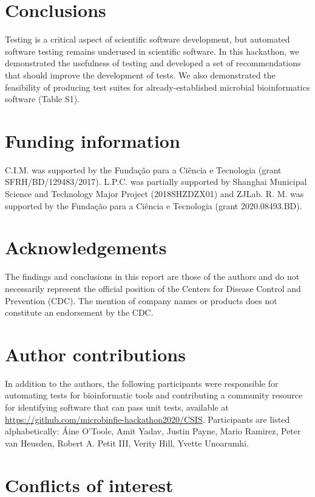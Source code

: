 \section{Conclusions}
 
Testing is a critical aspect of scientific software development, but automated software testing remains underused in scientific software. In this hackathon, we demonstrated the usefulness of testing and developed a set of recommendations that should improve the development of tests. We also demonstrated the feasibility of producing test suites for already-established microbial bioinformatics software (Table S1).

 
\section{Funding information}
 
C.I.M. was supported by the Fundação para a Ciência e Tecnologia (grant SFRH/BD/129483/2017). L.P.C. was partially supported by Shanghai Municipal Science and Technology Major Project (2018SHZDZX01) and ZJLab. R. M. was supported by the Fundação para a Ciência e Tecnologia (grant 2020.08493.BD).

 
\section{Acknowledgements}
 
The findings and conclusions in this report are those of the authors and do not necessarily represent the official position of the Centers for Disease Control and Prevention (CDC). The mention of company names or products does not constitute an endorsement by the CDC.

 
\section{Author contributions}
 
In addition to the authors, the following participants were responsible for automating tests for bioinformatic tools and contributing a community resource for identifying software that can pass unit tests, available at \url{https://github.com/microbinfie-hackathon2020/CSIS}. Participants are listed alphabetically: Áine O’Toole, Amit Yadav, Justin Payne, Mario Ramirez, Peter van Heusden, Robert A. Petit III, Verity Hill, Yvette Unoarumhi.

 
\section{Conflicts of interest}
 
